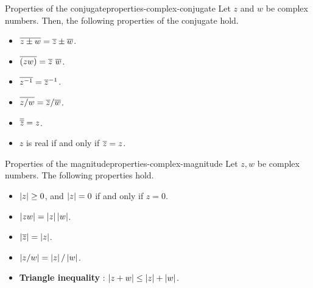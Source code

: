 \begin{proposition}{Properties of the conjugate}{properties-complex-conjugate}
  Let $z$ and $w$ be complex numbers. Then, the following properties
  of the conjugate hold.%
  \begin{itemize}
  \item $\overline{z\pm w} = \overline{z} \pm \overline{w}$.
  \item $\overline{(zw)} = \overline{z}~ \overline{w}$.
  \item $\overline{z^{-1}} = \overline{z}^{-1}$.
  \item $\overline{z/w} = \overline{z} / \overline{w}$.
  \item $\overline{\overline{z}}=z$.
  \item $z$ is real if and only if $\overline{z}=z$.
  \end{itemize}
\end{proposition}

\begin{proposition}{Properties of the magnitude}{properties-complex-magnitude}
  Let $z,w$ be complex numbers.  The following properties hold.%
  \begin{itemize}
  \item $\left|z\right| \geq 0$, and $\left|z\right|=0$ if and only if $z=0$.
  \item $\left|zw\right| = \left|z\right|\left|w\right|$.
  \item $\left|\overline{z}\right| = \left|z\right|$.
  \item $\left|z/w\right| = \left|z\right|/\left|w\right|$.
  \item \textbf{Triangle inequality}%
    :
    $\left|z+w\right| \leq \left|z\right| + \left|w\right|$.
  \end{itemize}
\end{proposition}
